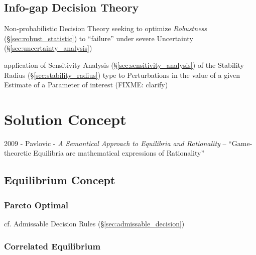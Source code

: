 \begin{itemize}
\subsection{Info-gap Decision Theory}\label{sec:info_gap}

Non-probabilistic Decision Theory seeking to optimize \emph{Robustness}
(\S\ref{sec:robust_statistic}) to ``failure'' under severe Uncertainty
(\S\ref{sec:uncertainty_analysis})

application of Sensitivity Analysis (\S\ref{sec:sensitivity_analysis}) of the
Stability Radius (\S\ref{sec:stability_radius}) type to Perturbations in the
value of a given Estimate of a Parameter of interest (FIXME: clarify)



\section{Solution Concept}\label{sec:solution_concept}

2009 - Pavlovic - \emph{A Semantical Approach to Equilibria and Rationality} --
``Game-theoretic Equilibria are mathematical expressions of Rationality''



\subsection{Equilibrium Concept}\label{sec:equilibrium_concept}

\subsubsection{Pareto Optimal}\label{sec:pareto_optimal}

\fist cf. Admissable Decision Rules (\S\ref{sec:admissable_decision})



\subsubsection{Correlated Equilibrium}\label{sec:correlated_equilibrium}


\end{itemize}
